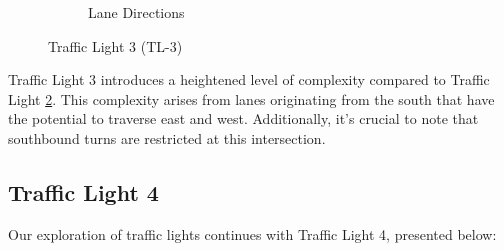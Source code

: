 \begin{figure}[h]
\begin{subfigure}{0.45\textwidth}
        \caption{Lane Directions}
    \end{subfigure}
    \caption{Traffic Light 3 (TL-3)}
    \label{fig:tl-3}
\end{figure}

Traffic Light 3 introduces a heightened level of complexity compared to Traffic Light \hyperref[sec:tl-2]{2}. This complexity arises from lanes originating from the south that have the potential to traverse east and west. Additionally, it's crucial to note that southbound turns are restricted at this intersection.

\subsection{Traffic Light 4} \label{sec:tl-4}
Our exploration of traffic lights continues with Traffic Light 4, presented below:

